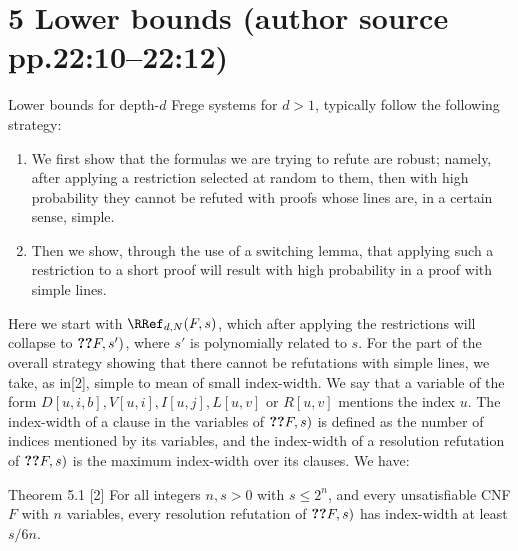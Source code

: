 \section*{5 Lower bounds (author source pp.22:10--22:12)}
Lower bounds for depth-$d$ Frege systems for $d>1$, typically follow the following strategy:
\begin{enumerate}\item We first show that the formulas we are trying to refute are robust; namely, after applying a restriction selected at random to them, then with high probability they cannot be refuted with proofs whose lines are, in a certain sense, simple.\item Then we show, through the use of a switching lemma, that applying such a restriction to a short proof will result with high probability in a proof with simple lines.\end{enumerate}
Here we start with $\RRef_{d,N}(F,s)$, which after applying the restrictions will collapse to $\Ref(F,s')$, where $s'$ is polynomially related to $s$. For the part of the overall strategy showing that there cannot be refutations with simple lines, we take, as in[2], simple to mean of small index-width. We say that a variable of the form $D[u,i,b],V[u,i],I[u,j],L[u,v]$ or $R[u,v]$ mentions the index $u$. The index-width of a clause in the variables of $\Ref(F,s)$ is defined as the number of indices mentioned by its variables, and the index-width of a resolution refutation of $\Ref(F,s)$ is the maximum index-width over its clauses. We have:
\begin{originalresult}{Theorem 5.1 [2]}
For all integers $n,s>0$ with $s\le2^n$, and every unsatisfiable CNF $F$ with $n$ variables, every resolution refutation of $\Ref(F,s)$ has index-width at least $s/6n$.
\end{originalresult}
